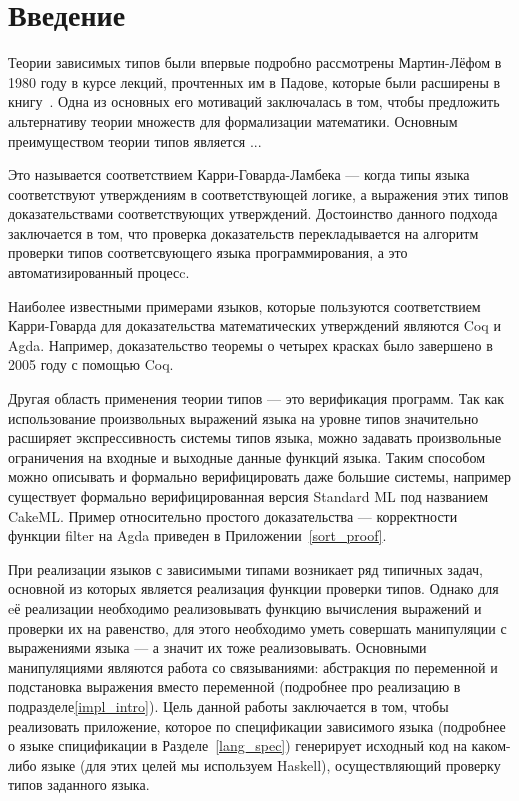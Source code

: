 \section*{Введение}
  Теории зависимых типов были впервые подробно рассмотрены Мартин-Лёфом в 1980 году в курсе лекций, прочтенных им в Падове, которые были расширены в книгу~\cite{martin_lof}. Одна из основных его мотиваций заключалась в том, чтобы предложить альтернативу теории множеств для формализации математики. Основным преимуществом теории типов является ... 

Это называется соответствием Карри-Говарда-Ламбека\cite{curry_how} --- когда типы языка соответствуют утверждениям в соответствующей логике, а выражения этих типов доказательствами соответствующих утверждений. Достоинство данного подхода заключается в том, что проверка доказательств перекладывается на алгоритм проверки типов соответсвующего языка программирования, а это автоматизированный процесc.

Наиболее известными примерами языков, которые пользуются соответствием Карри-Говарда для доказательства математических утверждений являются Coq\cite{coq} и Agda\cite{agda}. Например, доказательство теоремы о четырех красках было завершено в 2005 году с помощью Coq\cite{weisstein2002four}.

Другая область применения теории типов --- это верификация программ. Так как использование произвольных выражений языка на уровне типов значительно расширяет экспрессивность системы типов языка, можно задавать произвольные ограничения на входные и выходные данные функций языка. Таким способом можно описывать и формально верифицировать даже большие системы, например существует формально верифицированная версия Standard ML\cite{ml_lang} под названием CakeML\cite{ml_cake}. Пример относительно простого доказательства --- корректности функции filter на Agda приведен в Приложении~\ref{sort_proof}.

\hfill

При реализации языков с зависимыми типами возникает ряд типичных задач, основной из которых является реализация функции проверки типов. Однако для eё реализации необходимо реализовывать функцию вычисления выражений и проверки их на равенство, для этого необходимо уметь совершать манипуляции с выражениями языка --- а значит их тоже реализовывать. Основными манипуляциями являются работа со связываниями: абстракция по переменной и подстановка выражения вместо переменной (подробнее про реализацию в подразделе\ref{impl_intro}). Цель данной работы заключается в том, чтобы реализовать приложение, которое по спецификации зависимого языка (подробнее о языке спицификации в Разделе~\ref{lang_spec}) генерирует исходный код на каком-либо языке (для этих целей мы используем Haskell\cite{haskell}), осуществляющий проверку типов заданного языка.

